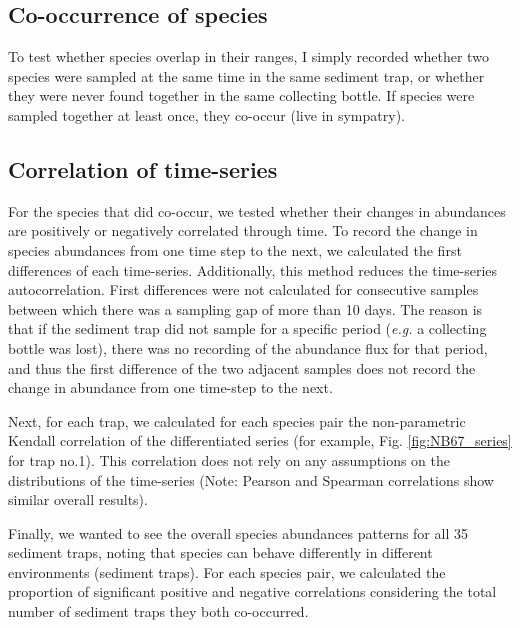 \subsection{Co-occurrence of species}

To test whether species overlap in their ranges, I simply recorded whether two species were sampled at the same time in the same sediment trap, or whether they were never found together in the same collecting bottle. If species were sampled together at least once, they co-occur (live in sympatry). 

\subsection{Correlation of time-series}

For the species that did co-occur, we tested whether their changes in abundances are positively or negatively correlated through time. To record the change in species abundances from one time step to the next, we calculated the first differences of each time-series. Additionally, this method reduces the time-series autocorrelation. %
First differences were not calculated for consecutive samples between which there was a sampling gap of more than 10 days. The reason is that if the sediment trap did not sample for a specific period (\textit{e.g.} a collecting bottle was lost), there was no recording of the abundance flux for that period, and thus the first difference of the two adjacent samples does not record the change in abundance from one time-step to the next.

Next, for each trap, we calculated for each species pair the non-parametric Kendall correlation of the differentiated series (for example, Fig. \ref{fig:NB67_series} for trap no.1). This correlation does not rely on any assumptions on the distributions of the time-series (Note: Pearson and Spearman correlations show similar overall results). 

Finally, we wanted to see the overall species abundances patterns for all 35 sediment traps, noting that species can behave differently in different environments (sediment traps). For each species pair, we calculated the proportion of significant positive and negative correlations considering the total number of sediment traps they both co-occurred.



